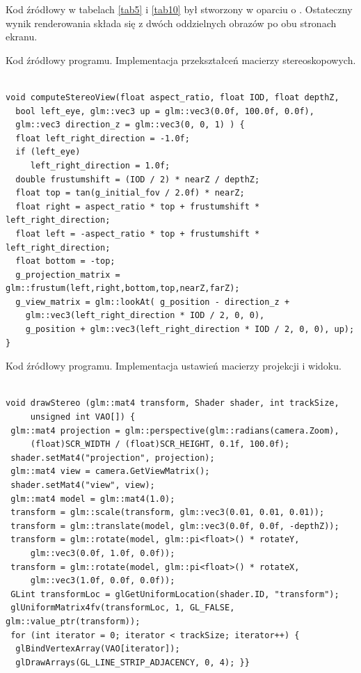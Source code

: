 Kod źródłowy w tabelach \ref{tab5} i \ref{tab10} był stworzony w oparciu o \cite{openglCookbook}. Ostateczny wynik renderowania składa się z dwóch oddzielnych obrazów po obu stronach ekranu.
\begin{table}[H]
\caption{Kod źródłowy programu. Implementacja przekształceń macierzy stereoskopowych.}
\label{tab5}
\begin{lstlisting}[frame=single]  % Start your code-block

void computeStereoView(float aspect_ratio, float IOD, float depthZ, 
  bool left_eye, glm::vec3 up = glm::vec3(0.0f, 100.0f, 0.0f), 
  glm::vec3 direction_z = glm::vec3(0, 0, 1) ) {
  float left_right_direction = -1.0f;
  if (left_eye)
     left_right_direction = 1.0f;
  double frustumshift = (IOD / 2) * nearZ / depthZ;
  float top = tan(g_initial_fov / 2.0f) * nearZ;
  float right = aspect_ratio * top + frustumshift * left_right_direction;
  float left = -aspect_ratio * top + frustumshift * left_right_direction;
  float bottom = -top;
  g_projection_matrix = glm::frustum(left,right,bottom,top,nearZ,farZ);
  g_view_matrix = glm::lookAt( g_position - direction_z + 
  	glm::vec3(left_right_direction * IOD / 2, 0, 0),
    g_position + glm::vec3(left_right_direction * IOD / 2, 0, 0), up); }
\end{lstlisting}
\end{table}
\begin{table}[H]
\caption{Kod źródłowy programu. Implementacja ustawień macierzy projekcji i widoku.}
\label{tab10}
\begin{lstlisting}[frame=single]  % Start your code-block

void drawStereo (glm::mat4 transform, Shader shader, int trackSize,
     unsigned int VAO[]) {
 glm::mat4 projection = glm::perspective(glm::radians(camera.Zoom),
     (float)SCR_WIDTH / (float)SCR_HEIGHT, 0.1f, 100.0f);
 shader.setMat4("projection", projection);
 glm::mat4 view = camera.GetViewMatrix();
 shader.setMat4("view", view);
 glm::mat4 model = glm::mat4(1.0);
 transform = glm::scale(transform, glm::vec3(0.01, 0.01, 0.01));
 transform = glm::translate(model, glm::vec3(0.0f, 0.0f, -depthZ));
 transform = glm::rotate(model, glm::pi<float>() * rotateY, 
     glm::vec3(0.0f, 1.0f, 0.0f));
 transform = glm::rotate(model, glm::pi<float>() * rotateX, 
     glm::vec3(1.0f, 0.0f, 0.0f));
 GLint transformLoc = glGetUniformLocation(shader.ID, "transform");
 glUniformMatrix4fv(transformLoc, 1, GL_FALSE, glm::value_ptr(transform));
 for (int iterator = 0; iterator < trackSize; iterator++) {
  glBindVertexArray(VAO[iterator]);
  glDrawArrays(GL_LINE_STRIP_ADJACENCY, 0, 4); }}
\end{lstlisting}
\end{table}

